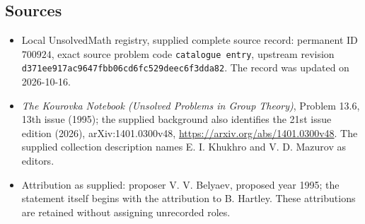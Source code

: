 \documentclass[11pt]{article}
\begin{document}
\subsection{Sources}
\begin{itemize}
\item Local UnsolvedMath registry, supplied complete source record: permanent ID \(700924\), exact source problem code \texttt{catalogue entry}, upstream revision \texttt{d371ee917ac9647fbb06cd6fc529deec6f3dda82}. The record was updated on 2026-10-16.
\item \emph{The Kourovka Notebook (Unsolved Problems in Group Theory)}, Problem 13.6, 13th issue (1995); the supplied background also identifies the 21st issue edition (2026), arXiv:1401.0300v48, \url{https://arxiv.org/abs/1401.0300v48}. The supplied collection description names E. I. Khukhro and V. D. Mazurov as editors.
\item Attribution as supplied: proposer V. V. Belyaev, proposed year 1995; the statement itself begins with the attribution to B. Hartley. These attributions are retained without assigning unrecorded roles.
\end{itemize}
\end{document}
